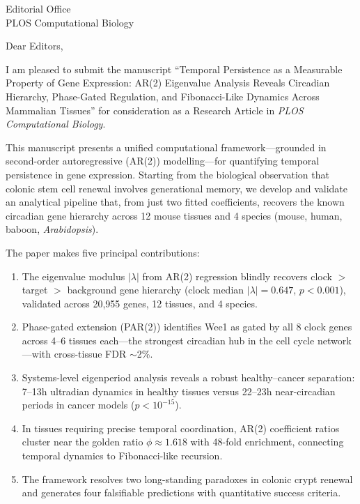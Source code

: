 \documentclass[11pt,letterpaper]{letter}
\begin{document}
\begin{letter}{Editorial Office \\ PLOS Computational Biology}

\opening{Dear Editors,}

I am pleased to submit the manuscript ``Temporal Persistence as a Measurable Property of Gene Expression: AR(2) Eigenvalue Analysis Reveals Circadian Hierarchy, Phase-Gated Regulation, and Fibonacci-Like Dynamics Across Mammalian Tissues'' for consideration as a Research Article in \textit{PLOS Computational Biology}.

This manuscript presents a unified computational framework---grounded in second-order autoregressive (AR(2)) modelling---for quantifying temporal persistence in gene expression. Starting from the biological observation that colonic stem cell renewal involves generational memory, we develop and validate an analytical pipeline that, from just two fitted coefficients, recovers the known circadian gene hierarchy across 12 mouse tissues and 4 species (mouse, human, baboon, \textit{Arabidopsis}).

The paper makes five principal contributions:

\begin{enumerate}
\item The eigenvalue modulus $|\lambda|$ from AR(2) regression blindly recovers clock $>$ target $>$ background gene hierarchy (clock median $|\lambda| = 0.647$, $p < 0.001$), validated across 20,955 genes, 12 tissues, and 4 species.

\item Phase-gated extension (PAR(2)) identifies Wee1 as gated by all 8 clock genes across 4--6 tissues each---the strongest circadian hub in the cell cycle network---with cross-tissue FDR $\sim$2\%.

\item Systems-level eigenperiod analysis reveals a robust healthy--cancer separation: 7--13h ultradian dynamics in healthy tissues versus 22--23h near-circadian periods in cancer models ($p < 10^{-15}$).

\item In tissues requiring precise temporal coordination, AR(2) coefficient ratios cluster near the golden ratio $\phi \approx 1.618$ with 48-fold enrichment, connecting temporal dynamics to Fibonacci-like recursion.

\item The framework resolves two long-standing paradoxes in colonic crypt renewal and generates four falsifiable predictions with quantitative success criteria.
\end{enumerate}


\end{letter}
\end{document}

